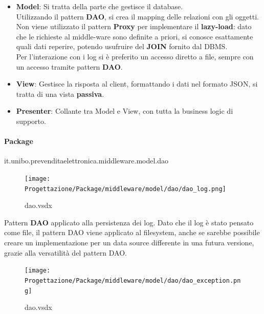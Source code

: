 \documentclass[a4paper]{article}
\begin{document}
\begin{itemize}
    \item \textbf{Model}: Si tratta della parte che gestisce il database.\\Utilizzando il pattern \textbf{DAO}, si crea il mapping delle relazioni con gli oggetti.\\Non viene utilizzato il pattern \textbf{Proxy} per implementare il \textbf{lazy-load}: dato che le richieste al middle-ware sono definite a priori, si conosce esattamente quali dati reperire, potendo usufruire del \textbf{JOIN} fornito dal DBMS.\\Per l'interazione con i log si è preferito un accesso diretto a file, sempre con un accesso tramite pattern \textbf{DAO}.
    \item \textbf{View}: Gestisce la risposta al client, formattando i dati nel formato JSON, si tratta di una vista \textbf{passiva}.
    \item \textbf{Presenter}: Collante tra Model e View, con tutta la business logic di supporto.
\end{itemize}

\paragraph{Package} it.unibo.prevenditaelettronica.middleware.model.dao




\begin{figure}[H]
    \texttt{[image: Progettazione/Package/middleware/model/dao/dao\_log.png]}
    \centering
    \caption{dao.vsdx}
\end{figure}

Pattern \textbf{DAO} applicato alla persistenza dei log. Dato che il log è stato pensato come file, il pattern DAO viene applicato al filesystem, anche se sarebbe possibile creare un implementazione per un data source differente in una futura versione, grazie alla versatilità del pattern DAO.

\begin{figure}[H]
    \texttt{[image: Progettazione/Package/middleware/model/dao/dao\_exception.png]}
    \centering
    \caption{dao.vsdx}
\end{figure}
\end{document}
